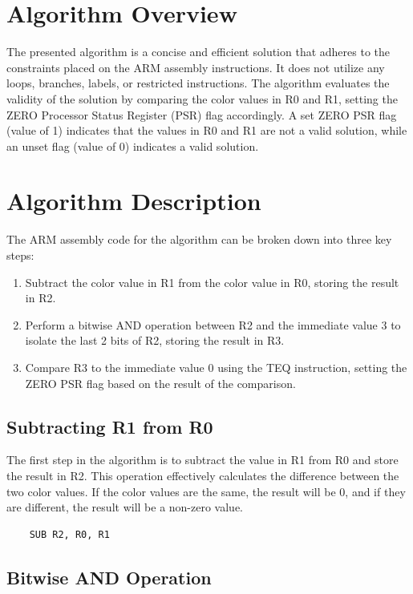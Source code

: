 \section{Algorithm Overview}

The presented algorithm is a concise and efficient solution that adheres to the constraints placed on the ARM assembly instructions. It does not utilize any loops, branches, labels, or restricted instructions. The algorithm evaluates the validity of the solution by comparing the color values in R0 and R1, setting the ZERO Processor Status Register (PSR) flag accordingly. A set ZERO PSR flag (value of 1) indicates that the values in R0 and R1 are not a valid solution, while an unset flag (value of 0) indicates a valid solution.

\section{Algorithm Description}

The ARM assembly code for the algorithm can be broken down into three key steps:

\begin{enumerate}
    \item Subtract the color value in R1 from the color value in R0, storing the result in R2.
    \item Perform a bitwise AND operation between R2 and the immediate value 3 to isolate the last 2 bits of R2, storing the result in R3.
    \item Compare R3 to the immediate value 0 using the TEQ instruction, setting the ZERO PSR flag based on the result of the comparison.
\end{enumerate}

\subsection{Subtracting R1 from R0}

The first step in the algorithm is to subtract the value in R1 from R0 and store the result in R2. This operation effectively calculates the difference between the two color values. If the color values are the same, the result will be 0, and if they are different, the result will be a non-zero value.

\begin{verbatim}
    SUB R2, R0, R1
\end{verbatim}

\subsection{Bitwise AND Operation}

